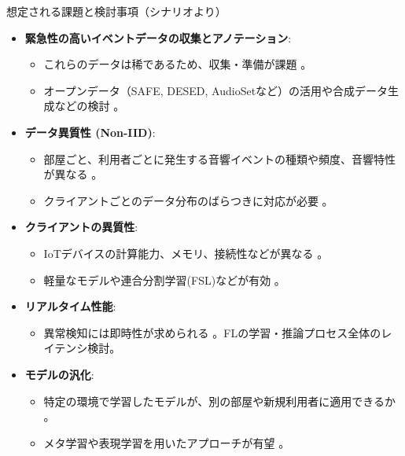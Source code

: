 \documentclass[unicode,12pt,aspectratio=169,dvipdfmx]{beamer}
\begin{document}
\begin{frame}{想定される課題と検討事項（シナリオより）}
    \begin{itemize}
        \item \textbf{緊急性の高いイベントデータの収集とアノテーション}:
        \begin{itemize}
            \item これらのデータは稀であるため、収集・準備が課題 \cite{Source50, Source521}。
            \item オープンデータ（SAFE, DESED, AudioSetなど）の活用や合成データ生成などの検討 \cite{Source520, Source547}。
        \end{itemize}
        \item \textbf{データ異質性 (Non-IID)}:
        \begin{itemize}
            \item 部屋ごと、利用者ごとに発生する音響イベントの種類や頻度、音響特性が異なる \cite{Source521}。
            \item クライアントごとのデータ分布のばらつきに対応が必要 \cite{Source521}。
        \end{itemize}
        \item \textbf{クライアントの異質性}:
        \begin{itemize}
            \item IoTデバイスの計算能力、メモリ、接続性などが異なる \cite{Source55, Source521}。
            \item 軽量なモデルや連合分割学習(FSL)などが有効 \cite{Source521}。
        \end{itemize}
        \item \textbf{リアルタイム性能}:
        \begin{itemize}
            \item 異常検知には即時性が求められる \cite{Source308}。FLの学習・推論プロセス全体のレイテンシ検討。
        \end{itemize}
        \item \textbf{モデルの汎化}:
        \begin{itemize}
            \item 特定の環境で学習したモデルが、別の部屋や新規利用者に適用できるか \cite{Source418}。
            \item メタ学習や表現学習を用いたアプローチが有望 \cite{Source418}。
        \end{itemize}
    \end{itemize}
\end{frame}
\end{document}

